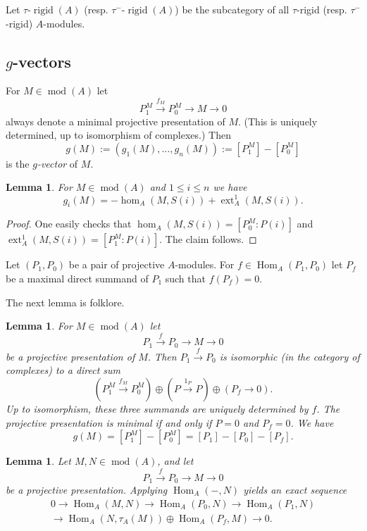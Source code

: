 \documentclass[12pt,reqno]{amsart}
\newtheorem{Lem}[Thm]{Lemma}
\theoremstyle{definition}
\newcommand{\md}{\operatorname{mod}}
\newcommand{\Hom}{\operatorname{Hom}}
\newcommand{\ext}{\operatorname{ext}}
\newcommand{\rigid}{\operatorname{rigid}}
\begin{document}
Let $\tau$-$\rigid(A)$ (resp. $\tau^-$-$\rigid(A)$) be the subcategory of all $\tau$-rigid (resp. $\tau^-$-rigid) $A$-modules.

\subsection{$g$-vectors}\label{subsec:gvectors}
For $M \in \md(A)$ let
$$
P_1^M \xrightarrow{f_M} P_0^M \to M \to 0
$$
always denote
a minimal projective presentation of $M$.
(This is uniquely determined, up to isomorphism of complexes.)
Then
$$
g(M) := (g_1(M),\ldots,g_n(M)) := [P_1^M] - [P_0^M]
$$
is the \emph{$g$-vector} of $M$.

\begin{Lem}For $M \in \md(A)$ and
$1 \le i \le n$ we have
$$
g_i(M) = -\hom_A(M,S(i)) + \ext_A^1(M,S(i)).
$$
\end{Lem}

\begin{proof}
One easily checks that
$\hom_A(M,S(i)) = [P_0^M:P(i)]$ and
$\ext_A^1(M,S(i)) = [P_1^M:P(i)]$.
The claim follows.
\end{proof}

Let $(P_1,P_0)$ be a pair of projective $A$-modules.
For $f \in \Hom_A(P_1,P_0)$ let
$P_f$ be a maximal direct summand of $P_1$ such that
$f(P_f) = 0$.


The next lemma is folklore.

\begin{Lem}\label{lem:gvector1}
For $M \in \md(A)$
let
$$
P_1 \xrightarrow{f} P_0 \to M \to 0
$$
be a projective presentation of $M$.
Then $P_1 \xrightarrow{f} P_0$ is isomorphic
(in the category of complexes) to a
direct sum
$$
(P_1^M \xrightarrow{f_M} P_0^M) \oplus
(P \xrightarrow{1_P} P) \oplus
(P_f \to 0).
$$
Up to isomorphism, these three summands are uniquely determined
by $f$.
The projective presentation is minimal if and only if
$P = 0$ and $P_f = 0$.
We have
$$
g(M) =  [P_1^M] - [P_0^M] = [P_1] - [P_0] - [P_f].
$$
\end{Lem}





\begin{Lem}
\label{lem:gvector3}
Let $M,N \in \md(A)$, and let
$$
P_1 \xrightarrow{f} P_0 \to M \to 0
$$
be a projective presentation.
Applying $\Hom_A(-,N)$ yields an exact sequence
\begin{multline*}
0 \to \Hom_A(M,N) \to \Hom_A(P_0,N) \to \Hom_A(P_1,N)
\\
\to \Hom_A(N,\tau_A(M)) \oplus \Hom_A(P_f,M) \to 0.
\end{multline*}
\end{Lem}
\end{document}
